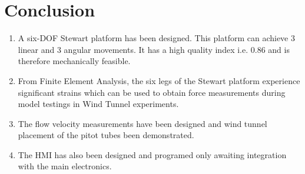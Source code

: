 \chapter{Conclusion}
\begin{enumerate}
\item A six-DOF Stewart platform has been designed. This platform can achieve 3 linear and 3 angular movements. It has a high quality index i.e. 0.86 and is therefore mechanically feasible.
\item From Finite Element Analysis, the six legs of the Stewart platform experience significant strains which can be used to obtain force measurements during model testings in Wind Tunnel experiments.
\item The flow velocity measurements have been designed and wind tunnel placement of the pitot tubes been demonstrated.
\item The HMI has also been designed and programed only awaiting integration with the main electronics.
\end{enumerate}


